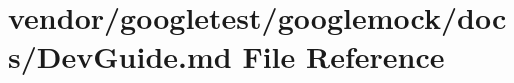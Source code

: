 \hypertarget{googlemock_2docs_2DevGuide_8md}{}\section{vendor/googletest/googlemock/docs/\+Dev\+Guide.md File Reference}
\label{googlemock_2docs_2DevGuide_8md}
